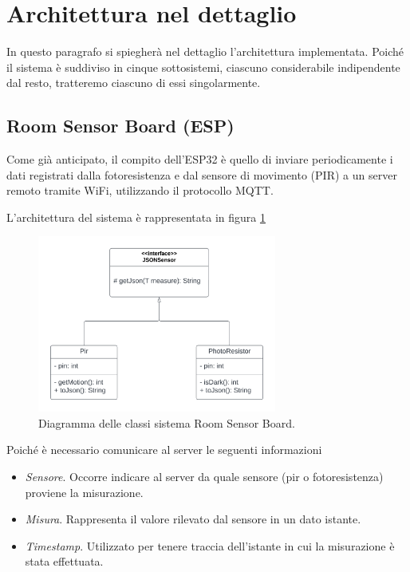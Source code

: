 \documentclass[a4paper,12pt]{report}
\begin{document}
\section{Architettura nel dettaglio}
In questo paragrafo si spiegherà nel dettaglio l'architettura implementata.
Poiché il sistema è suddiviso in cinque sottosistemi, ciascuno considerabile indipendente dal resto, tratteremo ciascuno di essi singolarmente.

\subsection{Room Sensor Board (ESP)}
Come già anticipato, il compito dell'ESP32 è quello di inviare periodicamente i dati registrati dalla fotoresistenza e dal sensore di movimento (PIR) a un server remoto tramite WiFi, utilizzando il protocollo MQTT.

L'architettura del sistema è rappresentata in figura \ref{fig:espclassi}

\begin{figure}[H]
    \centering
    \includegraphics[width=0.7\textwidth]{img/Classi - esp.png}
    \caption{Diagramma delle classi sistema Room Sensor Board.}
    \label{fig:espclassi}
\end{figure}

Poiché è necessario comunicare al server le seguenti informazioni
\begin{itemize}
    \item \emph{Sensore}. Occorre indicare al server da quale sensore (pir o fotoresistenza) proviene la misurazione.
    \item \emph{Misura}. Rappresenta il valore rilevato dal sensore in un dato istante.
    \item \emph{Timestamp}. Utilizzato per tenere traccia dell'istante in cui la misurazione è stata effettuata.
\end{itemize}
\end{document}

